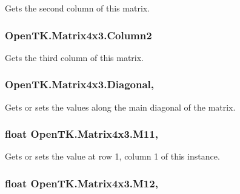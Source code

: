 Gets the second column of this matrix. 

\hypertarget{struct_open_t_k_1_1_matrix4x3_aa2329728c5e8e7fc095cd158b892e2bf}{
\subsubsection[{Column2}]{ Open\-T\-K.\-Matrix4x3.\-Column2\hspace{0.3cm}{\ttfamily [get]}}}\label{struct_open_t_k_1_1_matrix4x3_aa2329728c5e8e7fc095cd158b892e2bf}


Gets the third column of this matrix. 

\hypertarget{struct_open_t_k_1_1_matrix4x3_a072d3604ce3b9a51a5c909c6420657eb}{
\subsubsection[{Diagonal}]{ Open\-T\-K.\-Matrix4x3.\-Diagonal\hspace{0.3cm}{\ttfamily [get]}, {\ttfamily [set]}}}\label{struct_open_t_k_1_1_matrix4x3_a072d3604ce3b9a51a5c909c6420657eb}


Gets or sets the values along the main diagonal of the matrix. 

\hypertarget{struct_open_t_k_1_1_matrix4x3_a22f5fa5f1e12fdd947010ed03e3e3be7}{
\subsubsection[{M11}]{\setlength{\rightskip}{0pt plus 5cm}float Open\-T\-K.\-Matrix4x3.\-M11\hspace{0.3cm}{\ttfamily [get]}, {\ttfamily [set]}}}\label{struct_open_t_k_1_1_matrix4x3_a22f5fa5f1e12fdd947010ed03e3e3be7}


Gets or sets the value at row 1, column 1 of this instance. 

\hypertarget{struct_open_t_k_1_1_matrix4x3_a770f094c0ce30c9152654a6a76d73fd8}{
\subsubsection[{M12}]{\setlength{\rightskip}{0pt plus 5cm}float Open\-T\-K.\-Matrix4x3.\-M12\hspace{0.3cm}{\ttfamily [get]}, {\ttfamily [set]}}}\label{struct_open_t_k_1_1_matrix4x3_a770f094c0ce30c9152654a6a76d73fd8}


